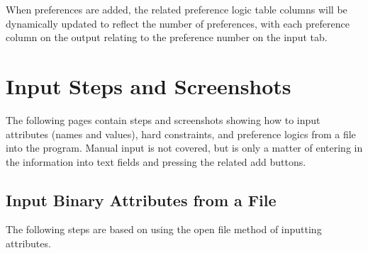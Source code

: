 \documentclass[12pt]{report}
\begin{document}
When preferences are added, the related preference logic table columns will be dynamically updated to reflect the number of preferences, with each preference column on the output relating to the preference number on the input tab.

\section{Input Steps and Screenshots}
The following pages contain steps and screenshots showing how to input attributes (names and values), hard constraints, and preference logics from a file into the program. Manual input is not covered, but is only a matter of entering in the information into text fields and pressing the related add buttons.

\newpage
\subsection{Input Binary Attributes from a File}
The following steps are based on using the open file method of inputting attributes.\\
\end{document}
